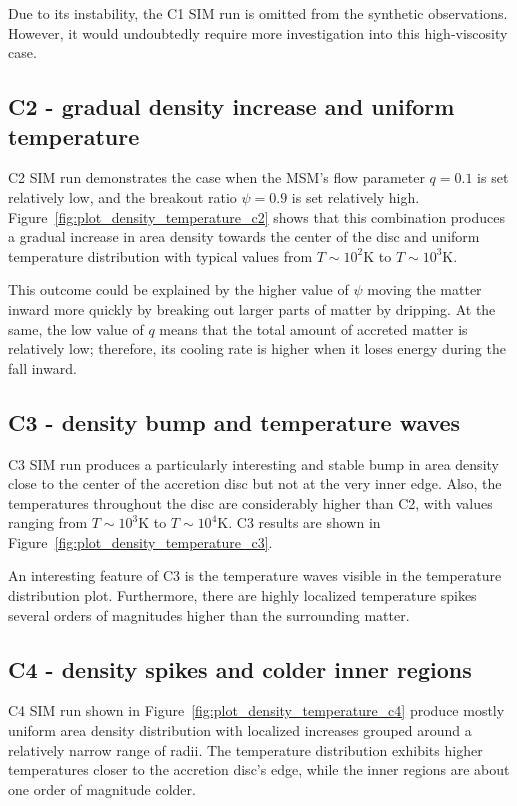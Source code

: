     Due to its instability, the C1 SIM run is omitted from the synthetic observations. However, it would undoubtedly require more investigation into this high-viscosity case.  

\subsection{C2 - gradual density increase and uniform temperature}
    C2 SIM run demonstrates the case when the MSM's flow parameter $q = 0.1$ is set relatively low, and the breakout ratio $\psi = 0.9$ is set relatively high. Figure~\ref{fig:plot_density_temperature_c2} shows that this combination produces a gradual increase in area density towards the center of the disc and uniform temperature distribution with typical values from $T \sim 10^2 \si{\kelvin}$ to $T \sim 10^3 \si{\kelvin}$. 

    This outcome could be explained by the higher value of $\psi$ moving the matter inward more quickly by breaking out larger parts of matter by dripping. At the same, the low value of $q$ means that the total amount of accreted matter is relatively low; therefore, its cooling rate is higher when it loses energy during the fall inward. 

\subsection{C3 - density bump and temperature waves}
    C3 SIM run produces a particularly interesting and stable bump in area density close to the center of the accretion disc but not at the very inner edge. Also, the temperatures throughout the disc are considerably higher than C2, with values ranging from $T \sim 10^3\si{\kelvin}$ to $T \sim 10^4\si{\kelvin}$. C3 results are shown in Figure~\ref{fig:plot_density_temperature_c3}. 

    An interesting feature of C3 is the temperature waves visible in the temperature distribution plot. Furthermore, there are highly localized temperature spikes several orders of magnitudes higher than the surrounding matter.

\subsection{C4 - density spikes and colder inner regions}
    C4 SIM run shown in Figure~\ref{fig:plot_density_temperature_c4} produce mostly uniform area density distribution with localized increases grouped around a relatively narrow range of radii. The temperature distribution exhibits higher temperatures closer to the accretion disc's edge, while the inner regions are about one order of magnitude colder. 

